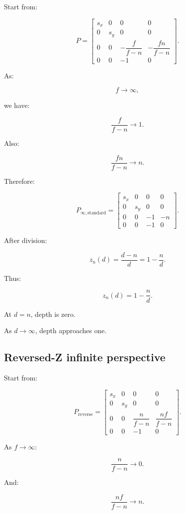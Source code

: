 Start from:

\[
 P= \begin{bmatrix} s_x&0&0&0\\ 0&s_y&0&0\\ 0&0&-\dfrac f{f-n}&-\dfrac{fn}{f-n}\\ 0&0&-1&0 \end{bmatrix}.
\]

As:

\[
 f\to\infty,
\]

we have:

\[
 \frac f{f-n}\to1.
\]

Also:

\[
 \frac{fn}{f-n}\to n.
\]

Therefore:

\[
 \boxed{ P_{\infty,\mathrm{standard}}= \begin{bmatrix} s_x&0&0&0\\ 0&s_y&0&0\\ 0&0&-1&-n\\ 0&0&-1&0 \end{bmatrix} }.
\]

After division:

\[
 z_n(d)= \frac{d-n}{d} = 1-\frac nd.
\]

Thus:

\[
 \boxed{ z_n(d)=1-\frac nd }.
\]

At \(d=n\), depth is zero.

As \(d\to\infty\), depth approaches one.

\subsection{Reversed-Z infinite perspective}\label{02-foundations-ii-ch033-reversed-z-infinite-perspective}

\hypertarget{02-foundations-ii-ch033-reversed-z-infinite-perspective}{}

Start from:

\[
 P_{\mathrm{reverse}}= \begin{bmatrix} s_x&0&0&0\\ 0&s_y&0&0\\ 0&0&\dfrac n{f-n}&\dfrac{nf}{f-n}\\ 0&0&-1&0 \end{bmatrix}.
\]

As \(f\to\infty\):

\[
 \frac n{f-n}\to0.
\]

And:

\[
 \frac{nf}{f-n}\to n.
\]

